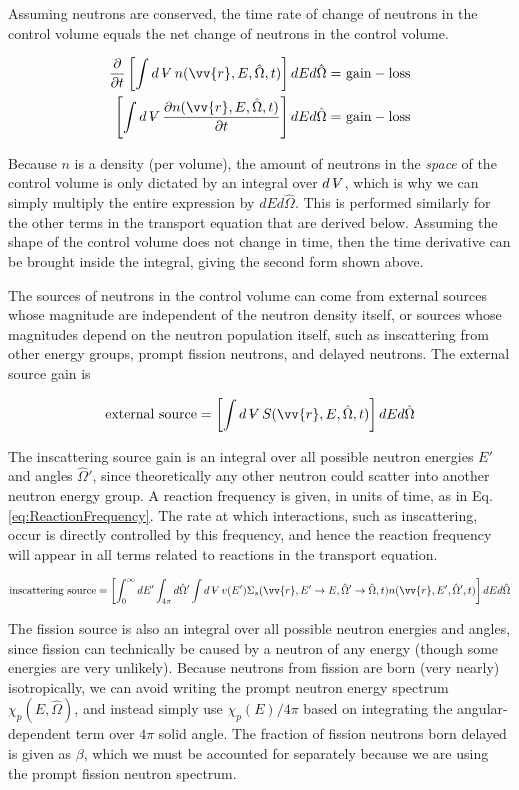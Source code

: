\documentclass[10pt]{article}
\newcommand{\beq}{\begin{equation}}
\newcommand{\eeq}{\end{equation}}
\newcommand{\beqa}{\begin{equation}\begin{aligned}}
\newcommand{\eeqa}{\end{aligned}\end{equation}}
\newcommand{\hO}{\hat{\Omega}}
\newcommand{\spa}{(\vv{r}, E, \hO, t)}
\newcommand{\spap}{(\vv{r}, E', \hO',t)}
\newcommand{\spang}{(\vv{r},E'\rightarrow E, \hO'\rightarrow\hO,t)}
\newcommand{\volume}{\mathop{\ooalign{\hfil$V$\hfil\cr\kern0.08em--\hfil\cr}}\nolimits}
\begin{document}
\begin{flushleft}
Assuming neutrons are conserved, the time rate of change of neutrons in the control volume equals the net change of neutrons in the control volume. 

\beqa
\label{eq:Conservation1}
\frac{\partial}{\partial t} \left\lbrack\int d\volume n\spa \right\rbrack dEd\hO   =\ & \textrm{gain} - \textrm{loss}\\
\left\lbrack\int d\volume \frac{\partial n\spa  }{\partial t}\right\rbrack dEd\hO   =\ & \textrm{gain} - \textrm{loss}\\
\eeqa

Because \(n\) is a density (per volume), the amount of neutrons in the \textit{space} of the control volume is only dictated by an integral over \(d\volume\), which is why we can simply multiply the entire expression by \(dEd\hO\). This is performed similarly for the other terms in the transport equation that are derived below. Assuming the shape of the control volume does not change in time, then the time derivative can be brought inside the integral, giving the second form shown above.

The sources of neutrons in the control volume can come from external sources whose magnitude are independent of the neutron density itself, or sources whose magnitudes depend on the neutron population itself, such as inscattering from other energy groups, prompt fission neutrons, and delayed neutrons. The external source gain is

\beq
\label{eq:ConservationExternalSource}
\textrm{external source} = \left\lbrack\int d\volume S\spa \right\rbrack dEd\hO  
\eeq

The inscattering source gain is an integral over all possible neutron energies \(E'\) and angles \(\hO'\), since theoretically any other neutron could scatter into another neutron energy group. A reaction frequency is given, in units of time, as in Eq. \ref{eq:ReactionFrequency}. The rate at which interactions, such as inscattering, occur is directly controlled by this frequency, and hence the reaction frequency will appear in all terms related to reactions in the transport equation.

\beq
\label{eq:ConservationInscatteringSource}
\textrm{inscattering source} = \left\lbrack\int_{0}^{\infty} dE'\int_{4\pi}^{} d\hO  '\int d\volume v(E')\Sigma_s\spang n\spap\right\rbrack dEd\hO  
\eeq

The fission source is also an integral over all possible neutron energies and angles, since fission can technically be caused by a neutron of any energy (though some energies are very unlikely). Because neutrons from fission are born (very nearly) isotropically, we can avoid writing the prompt neutron energy spectrum \(\chi_p(E,\hO)\), and instead simply use \(\chi_p(E)/4\pi\) based on integrating the angular-dependent term over \(4\pi\) solid angle. The fraction of fission neutrons born delayed is given as \(\beta\), which we must be accounted for separately because we are using the prompt fission neutron spectrum.


\end{flushleft}
\end{document}
